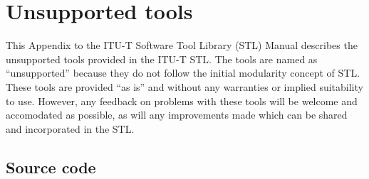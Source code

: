 
\chapter{Unsupported tools}

This Appendix to the ITU-T Software Tool Library (STL) Manual describes the unsupported tools provided in the ITU-T STL.
The tools are named as ``unsupported'' because they do not follow the initial modularity concept of STL.
These tools are provided ``as is'' and without any warranties or implied suitability to use.
However, any feedback on problems with these tools will be welcome and accomodated as possible, as will any improvements made which can be shared and incorporated in the STL.


\section{Source code}

